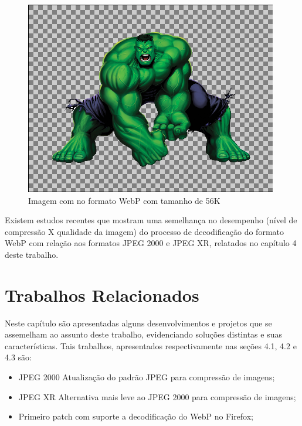 \documentclass[espaco=simples,appendix=Name]{abnt}
\begin{document}
\begin{figure}[h]
  \centering
    \includegraphics[scale=0.5]{Imagem3AlphaWEBP.png}
  \caption{Imagem com  no formato WebP com tamanho de 56K}
\end{figure}

Existem estudos recentes \cite{VP8Performance} que mostram uma semelhança no desempenho (nível de compressão X qualidade da imagem) do processo de decodificação do formato WebP com relação aos formatos JPEG 2000 e JPEG XR, relatados no capítulo 4 deste trabalho.

\chapter{Trabalhos Relacionados}

Neste capítulo são apresentadas alguns desenvolvimentos e projetos que se assemelham ao assunto deste trabalho, evidenciando soluções distintas e suas características. Tais trabalhos, apresentados respectivamente nas seções 4.1, 4.2 e 4.3 são:

\begin{itemize}
	\item JPEG 2000 Atualização do padrão JPEG para compressão de imagens;
	\item JPEG XR Alternativa mais leve ao JPEG 2000 para compressão de imagens;
	\item Primeiro patch com suporte a decodificação do WebP no Firefox;
\end{itemize}

\end{document}
